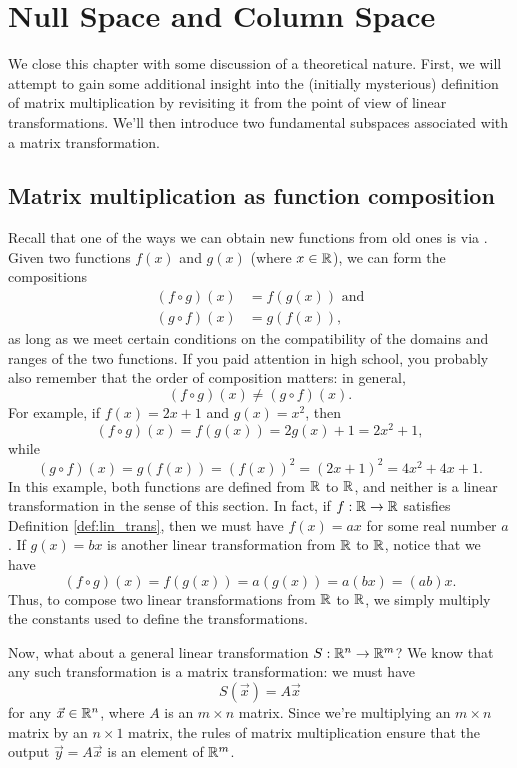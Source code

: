 \section{Null Space and Column Space}\label{sec:null_column}
We close this chapter with some discussion of a theoretical nature. First, we will attempt to gain some additional insight into the (initially mysterious) definition of matrix multiplication by revisiting it from the point of view of linear transformations. We'll then introduce two fundamental subspaces associated with a matrix transformation.

\subsection*{Matrix multiplication as function composition}
Recall that one of the ways we can obtain new functions from old ones is via . Given two functions $f(x)$ and $g(x)$ (where $x\in\mathbb{R}$), we can form the compositions
\begin{align*}
(f\circ g)(x) &= f(g(x)) \text{ and}\\
(g\circ f)(x) & = g(f(x)),
\end{align*}
as long as we meet certain conditions on the compatibility of the domains and ranges of the two functions. If you paid attention in high school, you probably also remember that the order of composition matters: in general,
\[
(f\circ g)(x) \neq (g\circ f)(x).
\]
For example, if $f(x) = 2x+1$ and $g(x) = x^2$, then
\[
(f\circ g)(x) = f(g(x)) = 2g(x)+1 = 2x^2+1,
\]
while
\[
(g\circ f)(x) = g(f(x)) = (f(x))^2 = (2x+1)^2 = 4x^2+4x+1.
\]
In this example, both functions are defined from $\mathbb{R}$ to $\mathbb{R}$, and neither is a linear transformation in the sense of this section. In fact, if $f:\mathbb{R}\to\mathbb{R}$ satisfies Definition \ref{def:lin_trans}, then we must have $f(x) = ax$ for some real number $a$. If $g(x) = bx$ is another linear transformation from $\mathbb{R}$ to $\mathbb{R}$, notice that we have
\[
(f\circ g)(x) = f(g(x))=a(g(x)) = a(bx) = (ab)x.
\]
Thus, to compose two linear transformations from $\mathbb{R}$ to $\mathbb{R}$, we simply multiply the constants used to define the transformations.

Now, what about a general linear transformation $S:\mathbb{R}^n\to \mathbb{R}^m$? We know that any such transformation is a matrix transformation: we must have
\[
S(\vec x) = A\vec x
\]
for any $\vec x\in\mathbb{R}^n$, where $A$ is an $m\times n$ matrix. Since we're multiplying an $m\times n$ matrix by an $n\times 1$ matrix, the rules of matrix multiplication ensure that the output $\vec y = A\vec x$ is an element of $\mathbb{R}^m$.

